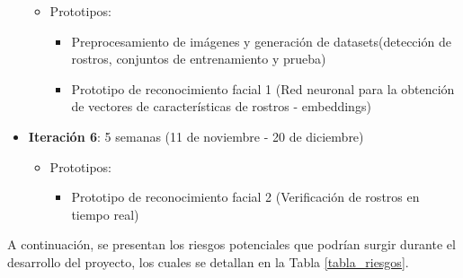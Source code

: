 \begin{itemize}
\begin{itemize}
			\item Prototipos:
			\begin{itemize}
				\item Preprocesamiento de imágenes y generación de datasets(detección de rostros, conjuntos de entrenamiento y prueba)
				\item Prototipo de reconocimiento facial 1 (Red neuronal para la obtención de vectores de características de rostros - embeddings)
			\end{itemize}

		\end{itemize}
		
		\item \textbf{Iteración 6}: 5 semanas (11 de noviembre -  20 de diciembre)
		\begin{itemize}
			\item Prototipos:
			\begin{itemize}
				\item Prototipo de reconocimiento facial 2 (Verificación de rostros en tiempo real)
			\end{itemize}
		\end{itemize}
	\end{itemize}
	
	A continuación, se presentan los riesgos potenciales que podrían surgir durante el desarrollo del proyecto, los cuales se detallan en la Tabla \ref{tabla_riesgos}.

